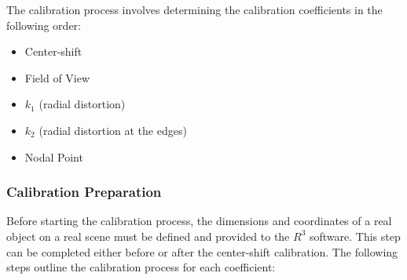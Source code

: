 \noindent The calibration process involves determining the calibration coefficients in the following order:

\begin{itemize}
    \item Center-shift
    \item Field of View
    \item \( k_1 \) (radial distortion)
    \item \( k_2 \) (radial distortion at the edges)
    \item Nodal Point
\end{itemize}

\subsubsection*{Calibration Preparation}

\noindent Before starting the calibration process, the dimensions and coordinates of a real object on a real scene must be defined and provided to the $R^3$ software. This step can be completed either before or after the center-shift calibration. The following steps outline the calibration process for each coefficient:

